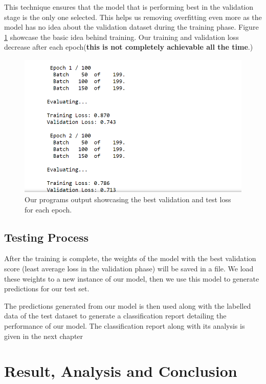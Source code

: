 \documentclass[a4paper, 12pt]{article}
\begin{document}
\begin{sloppypar}
  This technique ensures that the model that is performing best in the validation stage is the only one selected. This helps us removing overfitting even more as the model has no idea about the validation dataset during the training phase. Figure \ref{eval} showcase the basic idea behind training. Our training and validation loss decrease after each epoch(\textbf{this is not completely achievable all the time}.)
  \begin{figure}[H]
  \begin{center}
  \includegraphics[scale=0.65]{eval.png}
  \caption{Our programs output showcasing the best validation and test loss for each epoch.\label{eval}}
  \end{center}
  \end{figure}
  \subsection{Testing Process}
  
  After the training is complete, the weights of the model with the best validation score (least average loss in the validation phase) will be saved in a file. We load these weights to a new instance of our model, then we use this model to generate predictions for our test set.
  
  The predictions generated from our model is then used along with the labelled data of the test dataset to generate a classification report detailing the performance of our model. The classification report along with its analysis is given in the next chapter
  \clearpage
  \section{Result, Analysis and Conclusion}
  

\end{sloppypar}
\end{document}
